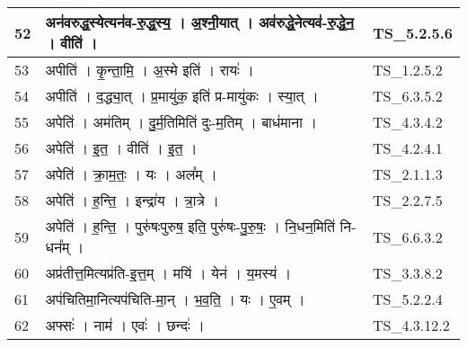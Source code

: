 \documentclass[17pt]{extarticle}
\begin{document}
\begin{longtable}{||p{0.4in}||p{4.9in}||p{0.9in}||}
    \hline
        
    52 & अन॑वरुद्ध॒स्येत्यन॑व{-}रु॒द्ध॒स्य॒   ।   अ॒श्नी॒यात्   ।   अव॑रुद्धे॒नेत्यव॑{-}रु॒द्धे॒न॒   ।   वीति॑   ।    & TS\_5.2.5.6       \\
    
    \hline
        
    53 & अपीति॑   ।   कृ॒न्ता॒मि॒   ।   अ॒स्मे इति॑   ।   रायः॑   ।    & TS\_1.2.5.2       \\
    
    \hline
        
    54 & अपीति॑   ।   द॒द्ध्या॒त्   ।   प्र॒मायु॑क॒ इति॑ प्र{-}मायु॑कः   ।   स्या॒त्   ।    & TS\_6.3.5.2       \\
    
    \hline
        
    55 & अपेति॑   ।   अम॑तिम्   ।   दु॒र्म॒तिमिति॑ दुः{-}म॒तिम्   ।   बाध॑माना   ।    & TS\_4.3.4.2       \\
    
    \hline
        
    56 & अपेति॑   ।   इ॒त॒   ।   वीति॑   ।   इ॒त॒   ।    & TS\_4.2.4.1       \\
    
    \hline
        
    57 & अपेति॑   ।   क्रा॒म॒तः॒   ।   यः   ।   अल᳚म्   ।    & TS\_2.1.1.3       \\
    
    \hline
        
    58 & अपेति॑   ।   ह॒न्ति॒   ।   इन्द्रा॑य   ।   त्रा॒त्रे   ।    & TS\_2.2.7.5       \\
    
    \hline
        
    59 & अपेति॑   ।   ह॒न्ति॒   ।   पुरु॑षःपुरुष॒ इति॒ पुरु॑षः{-}पु॒रु॒षः॒   ।   नि॒धन॒मिति॑ नि{-}धन᳚म्   ।    & TS\_6.6.3.2       \\
    
    \hline
        
    60 & अप्र॑तीत्त॒मित्यप्र॑ति{-}इ॒त्त॒म्   ।   मयि॑   ।   येन॑   ।   य॒मस्य॑   ।    & TS\_3.3.8.2       \\
    
    \hline
        
    61 & अप॑चितिमा॒नित्यप॑चिति{-}मा॒न्   ।   भ॒व॒ति॒   ।   यः   ।   ए॒वम्   ।    & TS\_5.2.2.4       \\
    
    \hline
        
    62 & अफ्सः॑   ।   नाम॑   ।   एवः॑   ।   छन्दः॑   ।    & TS\_4.3.12.2       \\
    

\end{longtable}
\end{document}
